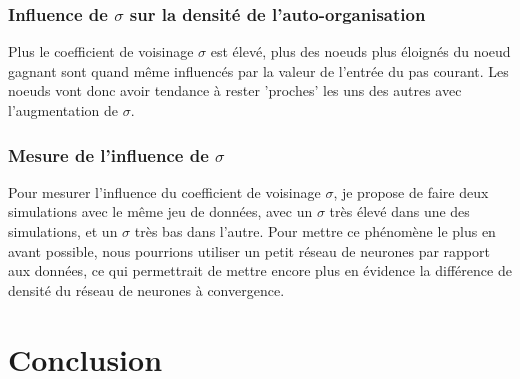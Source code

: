 \documentclass{article}
\begin{document}
\subsubsection{Influence de $\sigma$ sur la densité de l'auto-organisation}

Plus le coefficient de voisinage $\sigma$ est élevé, plus des noeuds plus éloignés du noeud gagnant sont quand même influencés par la valeur de l'entrée du pas courant. Les noeuds vont donc avoir tendance à rester 'proches' les uns des autres avec l'augmentation de $\sigma$.


\subsubsection{Mesure de l'influence de $\sigma$}

Pour mesurer l'influence du coefficient de voisinage $\sigma$, je propose de faire deux simulations avec le même jeu de données, avec un $\sigma$ très élevé dans une des simulations, et un $\sigma$ très bas dans l'autre. Pour mettre ce phénomène le plus en avant possible, nous pourrions utiliser un petit réseau de neurones par rapport aux données, ce qui permettrait de mettre encore plus en évidence la différence de densité du réseau de neurones à convergence.


\section{Conclusion}
\end{document}
